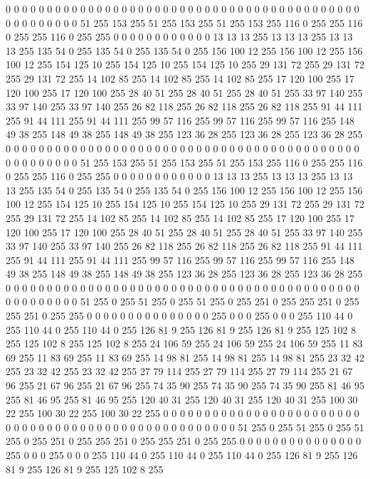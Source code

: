 0 0 0 0 0 0 0 0 0 0 0 0 0 0 0 0 0 0 0 0 0 0 0 0 0 0 0 0 0 0 0 0 0 0 0 0 0 0 0 0 0 0 0 0 0 0 0 0 0 0 0 0 51 255 153 255 51 255 153 255 51 255 153 255
116 0 255 255 116 0 255 255 116 0 255 255 0 0 0 0 0 0 0 0 0 0 0 0 13 13 13 255 13 13 13 255 13 13 13 255 135 54 0 255 135 54 0 255 135 54 0 255 156 100 12 255 156 100 12 255 156 100 12 255 154 125 10 255
154 125 10 255 154 125 10 255 29 131 72 255 29 131 72 255 29 131 72 255 14 102 85 255 14 102 85 255 14 102 85 255 17 120 100 255 17 120 100 255 17 120 100 255 28 40 51 255 28 40 51 255 28 40 51 255 33 97 140 255 33 97 140 255
33 97 140 255 26 82 118 255 26 82 118 255 26 82 118 255 91 44 111 255 91 44 111 255 91 44 111 255 99 57 116 255 99 57 116 255 99 57 116 255 148 49 38 255 148 49 38 255 148 49 38 255 123 36 28 255 123 36 28 255 123 36 28 255
0 0 0 0 0 0 0 0 0 0 0 0 0 0 0 0 0 0 0 0 0 0 0 0 0 0 0 0 0 0 0 0 0 0 0 0 0 0 0 0 0 0 0 0 0 0 0 0 0 0 0 0 51 255 153 255 51 255 153 255 51 255 153 255
116 0 255 255 116 0 255 255 116 0 255 255 0 0 0 0 0 0 0 0 0 0 0 0 13 13 13 255 13 13 13 255 13 13 13 255 135 54 0 255 135 54 0 255 135 54 0 255 156 100 12 255 156 100 12 255 156 100 12 255 154 125 10 255
154 125 10 255 154 125 10 255 29 131 72 255 29 131 72 255 29 131 72 255 14 102 85 255 14 102 85 255 14 102 85 255 17 120 100 255 17 120 100 255 17 120 100 255 28 40 51 255 28 40 51 255 28 40 51 255 33 97 140 255 33 97 140 255
33 97 140 255 26 82 118 255 26 82 118 255 26 82 118 255 91 44 111 255 91 44 111 255 91 44 111 255 99 57 116 255 99 57 116 255 99 57 116 255 148 49 38 255 148 49 38 255 148 49 38 255 123 36 28 255 123 36 28 255 123 36 28 255
0 0 0 0 0 0 0 0 0 0 0 0 0 0 0 0 0 0 0 0 0 0 0 0 0 0 0 0 0 0 0 0 0 0 0 0 0 0 0 0 0 0 0 0 0 0 0 0 0 0 0 0 51 255 0 255 51 255 0 255 51 255 0 255
251 0 255 255 251 0 255 255 251 0 255 255 0 0 0 0 0 0 0 0 0 0 0 0 0 0 0 255 0 0 0 255 0 0 0 255 110 44 0 255 110 44 0 255 110 44 0 255 126 81 9 255 126 81 9 255 126 81 9 255 125 102 8 255
125 102 8 255 125 102 8 255 24 106 59 255 24 106 59 255 24 106 59 255 11 83 69 255 11 83 69 255 11 83 69 255 14 98 81 255 14 98 81 255 14 98 81 255 23 32 42 255 23 32 42 255 23 32 42 255 27 79 114 255 27 79 114 255
27 79 114 255 21 67 96 255 21 67 96 255 21 67 96 255 74 35 90 255 74 35 90 255 74 35 90 255 81 46 95 255 81 46 95 255 81 46 95 255 120 40 31 255 120 40 31 255 120 40 31 255 100 30 22 255 100 30 22 255 100 30 22 255
0 0 0 0 0 0 0 0 0 0 0 0 0 0 0 0 0 0 0 0 0 0 0 0 0 0 0 0 0 0 0 0 0 0 0 0 0 0 0 0 0 0 0 0 0 0 0 0 0 0 0 0 51 255 0 255 51 255 0 255 51 255 0 255
251 0 255 255 251 0 255 255 251 0 255 255 0 0 0 0 0 0 0 0 0 0 0 0 0 0 0 255 0 0 0 255 0 0 0 255 110 44 0 255 110 44 0 255 110 44 0 255 126 81 9 255 126 81 9 255 126 81 9 255 125 102 8 255
